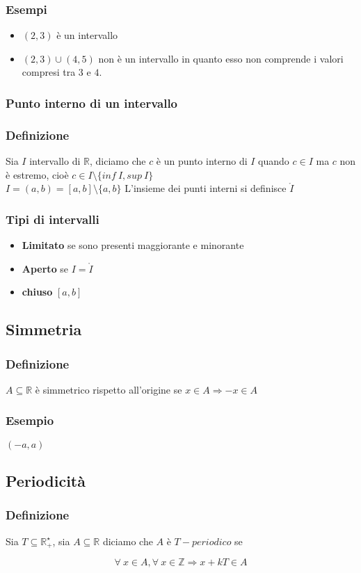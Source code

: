 \subsubsection*{Esempi}
\begin{itemize}
    \item $(2,3)$ è un intervallo
    \item $(2,3) \cup (4,5)$ non è un intervallo in quanto esso non comprende i valori compresi tra $3$ e $4$.
\end{itemize}
\subsubsection{Punto interno di un intervallo}
\subsubsection*{Definizione}
Sia $I$ intervallo di $\mathbb{R}$, diciamo che $c$ è un punto interno di $I$ quando $c \in I$ ma $c$ non è estremo,
cioè $c \in I \setminus \{inf\ I, sup\ I\}$\\
$I = (a,b)=[a,b]\setminus\{a,b\}$
L'insieme dei punti interni si definisce $\mathring{I}$
\subsubsection{Tipi di intervalli}
\begin{itemize}
    \item \textbf{Limitato} se sono presenti maggiorante e minorante
    \item \textbf{Aperto} se $I = \mathring{I}$
    \item \textbf{chiuso} $[a,b]$ 
\end{itemize}
\subsection{Simmetria}
\subsubsection*{Definizione}
$A \subseteq \mathbb{R}$ è simmetrico rispetto all'origine se $x \in A \Rightarrow -x \in A$
\subsubsection*{Esempio}
$(-a,a)$
\subsection{Periodicità}
\subsubsection*{Definizione}
Sia $T \subseteq \mathbb{R}_{+}^{\star}$, sia $A \subseteq \mathbb{R}$ diciamo che $A$ è $T-periodico$ se\\
\begin{Large}
    \begin{equation*}
        \forall\ x \in A, \forall\ x \in \mathbb{Z} \Rightarrow x + kT \in A
    \end{equation*}
\end{Large}
